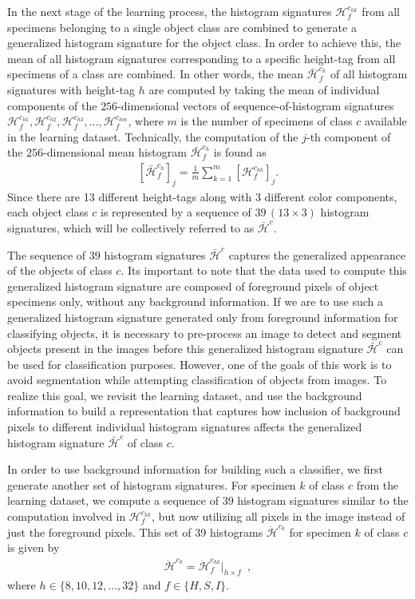 \documentclass {udthesis}
\begin{document}
In the next stage of the learning process, the histogram signatures $\mathcal{H}^{c_{hk}}_f$ from all specimens belonging to a single object class are combined to generate a generalized histogram signature for the object class.
In order to achieve this, the mean of all histogram signatures corresponding to a specific height-tag from all specimens of a class are combined. In other words, the mean $\bar{\mathcal{H}}^{c_{h}}_f$ of all histogram signatures with  height-tag $h$ are computed by taking the mean of individual components of the $256$-dimensional vectors of sequence-of-histogram signatures $\mathcal{H}^{c_{h1}}_f, \mathcal{H}^{c_{h2}}_f, \mathcal{H}^{c_{h3}}_f, \ldots, \mathcal{H}^{c_{hm}}_f$, where $m$ is the number of specimens of class $c$ available in the learning dataset. Technically, the computation of the $j$-th component of the $256$-dimensional mean histogram $\bar{\mathcal{H}}^{c_{h}}_f$ is found as
\begin{align}
 \left[\bar{\mathcal{H}}^{c_{h}}_f\right]_j=\frac{1}{m}\sum_{k=1}^{m} \left[ \mathcal{H}^{c_{hk}}_f \right]_j.
\end{align}
Since there are 13 different height-tags along with 3 different color components, each object class $c$ is represented by a sequence of $39\, (13 \times 3)$ histogram signatures, which will be collectively referred to as $\bar{\mathcal{H}}^{c}$.

The sequence of $39$ histogram signatures $\bar{\mathcal{H}}^{c}$ captures the generalized appearance of the objects of class $c$. Its important to note that the data used to compute this generalized histogram signature are composed of foreground pixels of object specimens only, without any background information. If we are to use such a generalized histogram signature generated only from foreground information for classifying objects, it is necessary to pre-process an image to detect and segment objects present in the images before this generalized histogram signature $\bar{\mathcal{H}}^{c}$ can be used for classification purposes. However, one of the goals of this work is to avoid segmentation while attempting classification of objects from images. To realize this goal, we revisit the learning dataset, and use the background information to build a representation that captures how inclusion of background pixels to different individual histogram signatures affects the generalized histogram signature $\bar{
\mathcal{H}}^{c}$ of class $c$. 

In order to use background information for building such a classifier, we first generate another set of histogram signatures.
For specimen $k$ of class $c$ from the learning dataset, we compute a sequence of $39$ histogram signatures similar to the computation involved in $\mathcal{H}^{c_{hk}}_f$, but now utilizing all pixels in the image instead of just the foreground pixels. This set of 39 histograms $\ddot{\mathcal{H}}^{c_{k}}$ for specimen $k$ of class $c$ is given by
\begin{align}	\label{eqn:hist_signature}
 \ddot{\mathcal{H}}^{c_{k}} = \ddot{\mathcal{H}}^{c_{hk}}_f \Big|_{h\times f}\enspace ,
\end{align}
%
where $h\in\{8,10,12, \ldots,32\}$ and $f\in\{H,S,I\}$.
\end{document}
